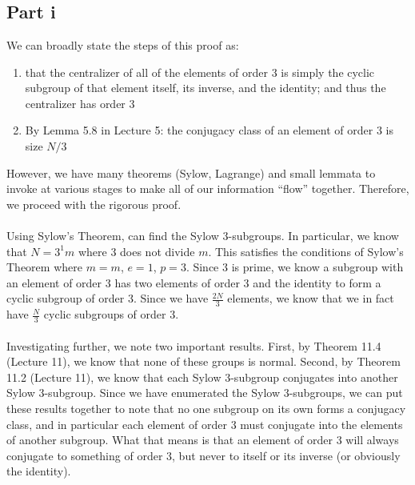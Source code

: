 \documentclass[letterpaper]{article}
\begin{document}
\section{}
\label{sec:Question1}

\subsection{Part i}
\label{subs:1Parti}

We can broadly state the steps of this proof as:
\begin{enumerate}
    \item that the centralizer of all of the elements of order $ 3 $ is simply the cyclic subgroup of that element itself, its inverse, and the identity; and thus the centralizer has order $ 3 $
    \item By Lemma 5.8 in Lecture 5: the conjugacy class of an element of order $ 3 $ is size $ N /3 $
\end{enumerate}
However, we have many theorems (Sylow, Lagrange) and small lemmata to invoke at various stages to make all of our information ``flow'' together.
Therefore, we proceed with the rigorous proof.
\\ \\
Using Sylow's Theorem, can find the Sylow $ 3 $-subgroups.
In particular, we know that $ N = 3^1 m $ where $ 3 $ does not divide $ m $.
This satisfies the conditions of Sylow's Theorem where $ m = m $, $ e = 1 $, $ p = 3 $.
Since $ 3 $ is prime, we know a subgroup with an element of order $ 3 $ has two elements of order $ 3 $ and the identity to form a cyclic subgroup of order $ 3 $.
Since we have $ \frac{2N}{3} $ elements, we know that we in fact have $ \frac{N}{3} $ cyclic subgroups of order $ 3 $.
\\ \\
Investigating further, we note two important results.
First, by Theorem 11.4 (Lecture 11), we know that none of these groups is normal.
Second, by Theorem 11.2 (Lecture 11), we know that each Sylow $ 3 $-subgroup conjugates into another Sylow $ 3 $-subgroup.
Since we have enumerated the Sylow $ 3 $-subgroups, we can put these results together to note that no one subgroup on its own forms a conjugacy class, and in particular each element of order $ 3 $ must conjugate into the elements of another subgroup.
What that means is that an element of order $ 3 $ will always conjugate to something of order $ 3 $, but never to itself or its inverse (or obviously the identity).
\\ \\
\end{document}
